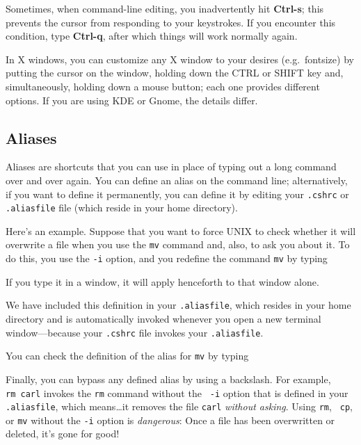 \documentclass[]{article}
\begin{document}
\noindent Sometimes, when command-line editing, you inadvertently hit
{\bf Ctrl-s}; this prevents the cursor from responding to your
keystrokes. If you encounter this condition, type {\bf Ctrl-q}, after
which things will work normally again.

	In X windows, you can customize any X window to your desires
(e.g.\ fontsize) by putting the cursor on the window, holding down the
CTRL or SHIFT key and, simultaneously, holding down a mouse button; each one
provides different options.  If you are using KDE or Gnome, the details
differ. 

\subsection{Aliases}\label{short}
	
	Aliases are shortcuts that you can use in place of typing out a
long command over and over again.  You can define an alias on the
command line; alternatively, if you want to define it permanently, you
can define it by editing your {\tt .cshrc} or {\tt .aliasfile} file
(which reside in your home directory).

	Here's an example. Suppose that you want to force UNIX to check
whether it will overwrite a file when you use the {\tt mv} command and,
also, to ask you about it. To do this,
you use the {\tt -i} option, and you redefine the command {\tt mv} by
typing


\noindent If you type it in a window, it will apply henceforth to that
window alone.  

We have included this definition in your {\tt .aliasfile}, which
resides in your home directory and is automatically invoked whenever
you open a new terminal window---because your {\tt .cshrc} file invokes
your {\tt .aliasfile}. 

You can check the definition of the alias for {\tt mv} by typing


Finally, you can bypass any defined alias by using a backslash. For
example, {\tt \\rm carl} invokes the {\tt rm} command without the {\tt
-i} option that is defined in your {\tt .aliasfile}, which means\dots it
removes the file {\tt carl} {\it without asking}. Using {\tt rm}, {\tt
  cp}, or {\tt mv} without the {\tt -i} option is {\it dangerous}: Once
a file has been overwritten or deleted, it's gone for good!
\end{document}
